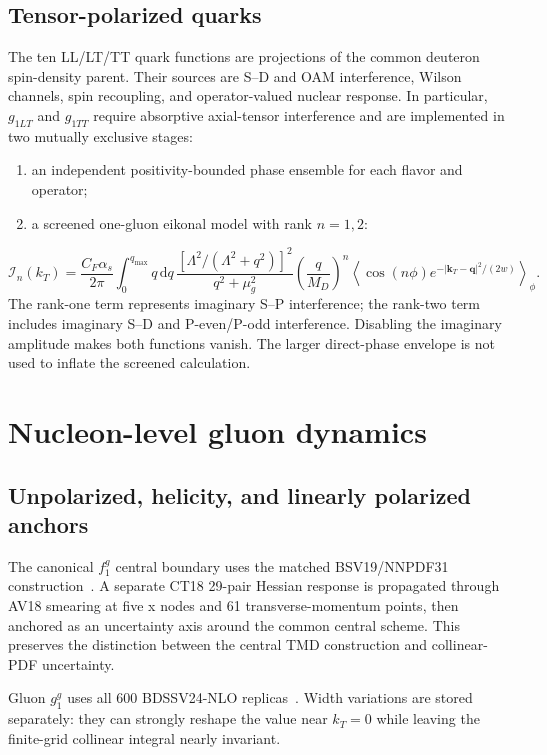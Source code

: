 \documentclass[11pt]{article}
\newcommand{\kT}{\bm{k}_{T}}
\newcommand{\dd}{\mathrm{d}}
\begin{document}
\subsection{Tensor-polarized quarks}

The ten LL/LT/TT quark functions are projections of the common deuteron
spin-density parent.  Their sources are S--D and OAM interference, Wilson
channels, spin recoupling, and operator-valued nuclear response.  In
particular, \(g_{1LT}\) and \(g_{1TT}\) require absorptive axial-tensor
interference and are implemented in two mutually exclusive stages:
\begin{enumerate}
  \item an independent positivity-bounded phase ensemble for each flavor
  and operator;
  \item a screened one-gluon eikonal model with rank \(n=1,2\):
\end{enumerate}
\begin{equation}
\mathcal I_n(k_T)=\frac{C_F\alpha_s}{2\pi}
\int_0^{q_{\max}}q\,\dd q\,
\frac{\left[\Lambda^2/(\Lambda^2+q^2)\right]^2}
     {q^2+\mu_g^2}
\left(\frac{q}{M_D}\right)^n
\left\langle
\cos(n\phi)e^{-|\kT-\bm q|^2/(2w)}
\right\rangle_\phi .
\label{eq:eikonal}
\end{equation}
The rank-one term represents imaginary S--P interference; the rank-two
term includes imaginary S--D and P-even/P-odd interference.  Disabling the
imaginary amplitude makes both functions vanish.  The larger direct-phase
envelope is not used to inflate the screened calculation.

\section{Nucleon-level gluon dynamics}
\label{sec:gluons}

\subsection{Unpolarized, helicity, and linearly polarized anchors}

The canonical \(f_1^g\) central boundary uses the matched
BSV19/NNPDF31 construction~\cite{BSV19}.  A separate CT18 29-pair Hessian response is
propagated through AV18 smearing at five x nodes and 61 transverse-momentum
points, then anchored as an uncertainty axis around the common central
scheme.  This preserves the distinction between the central TMD
construction and collinear-PDF uncertainty.

Gluon \(g_1^g\) uses all 600 BDSSV24-NLO replicas~\cite{BDSSV24}.
Width variations are
stored separately: they can strongly reshape the value near \(k_T=0\)
while leaving the finite-grid collinear integral nearly invariant.
\end{document}
